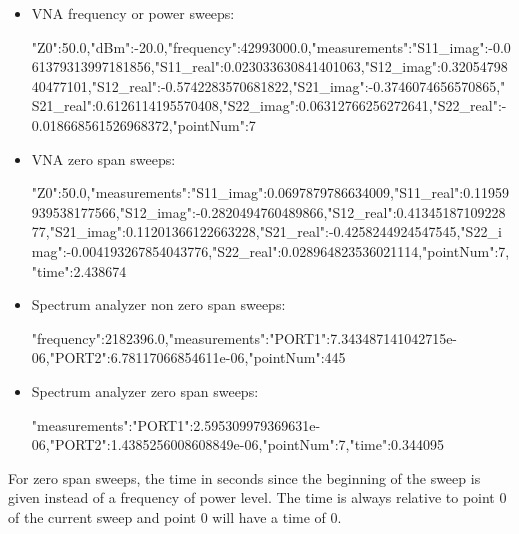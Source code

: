 \documentclass[a4paper,11pt]{article}
\begin{document}
\begin{itemize}
\item VNA frequency or power sweeps:
\begin{example}
{"Z0":50.0,"dBm":-20.0,"frequency":42993000.0,"measurements":{"S11_imag":-0.061379313997181856,"S11_real":0.023033630841401063,"S12_imag":0.3205479840477101,"S12_real":-0.5742283570681822,"S21_imag":-0.3746074656570865,"S21_real":0.6126114195570408,"S22_imag":0.06312766256272641,"S22_real":-0.018668561526968372},"pointNum":7}
\end{example}
\item VNA zero span sweeps:
\begin{example}
{"Z0":50.0,"measurements":{"S11_imag":0.0697879786634009,"S11_real":0.11959939538177566,"S12_imag":-0.2820494760489866,"S12_real":0.4134518710922877,"S21_imag":0.11201366122663228,"S21_real":-0.4258244924547545,"S22_imag":-0.004193267854043776,"S22_real":0.028964823536021114},"pointNum":7,"time":2.438674}
\end{example}
\item Spectrum analyzer non zero span sweeps:
\begin{example}
{"frequency":2182396.0,"measurements":{"PORT1":7.343487141042715e-06,"PORT2":6.78117066854611e-06},"pointNum":445}
\end{example}
\item Spectrum analyzer zero span sweeps:
\begin{example}
{"measurements":{"PORT1":2.595309979369631e-06,"PORT2":1.4385256008608849e-06},"pointNum":7,"time":0.344095}
\end{example}
\end{itemize}

For zero span sweeps, the time in seconds since the beginning of the sweep is given instead of a frequency of power level. The time is always relative to point 0 of the current sweep and point 0 will have a time of 0.
\end{document}
